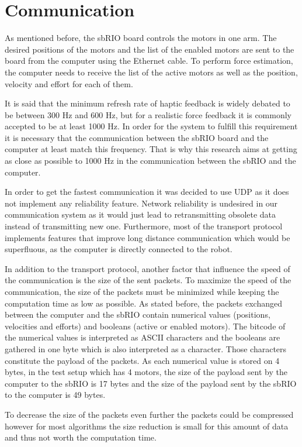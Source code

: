 \section{Communication}


As mentioned before, the sbRIO board controls the motors in one arm. The desired positions of the motors and the list of the enabled motors are sent to the board from the computer using the Ethernet cable. To perform force estimation, the computer needs to receive the list of the active motors as well as the position, velocity and effort for each of them.


It is said that the minimum refresh rate of haptic feedback is widely debated to
be between 300 Hz and 600 Hz, but for a realistic force feedback it is commonly accepted
to be at least 1000 Hz\cite{coles2011role}. In order for the system to fulfill this requirement it is necessary that the communication between the sbRIO board and the computer at least match this frequency. That is why this research aims at getting as close as possible to 1000 Hz in the communication between the sbRIO and the computer.


In order to get the fastest communication it was decided to use UDP as it does not implement any reliability feature. Network reliability is undesired in our communication system as it would just lead to retransmitting obsolete data instead of transmitting new one. Furthermore, most of the transport protocol implements features that improve long distance communication which would be superfluous, as the computer is directly connected to the robot.
 
In addition to the transport protocol, another factor that influence the speed of the communication is the size of the sent packets. To maximize the speed of the communication, the size of the packets must be minimized while keeping the computation time as low as possible. As stated before, the packets exchanged between the computer and the sbRIO contain numerical values (positions, velocities and efforts) and booleans (active or enabled motors). The bitcode of the numerical values is interpreted as ASCII characters and the booleans are gathered in one byte which is also interpreted as a character. Those characters constitute the payload of the packets. As each numerical value is stored on 4 bytes, in the test setup which has 4 motors, the size of the payload sent by the computer to the sbRIO is 17 bytes and the size of the payload sent by the sbRIO to the computer is 49 bytes.


To decrease the size of the packets even further the packets could be compressed however for most algorithms the size reduction is small for this amount of data and thus not worth the computation time.